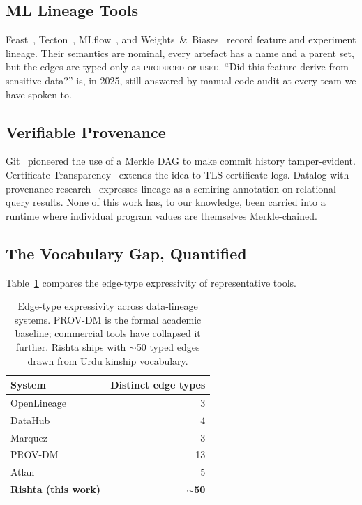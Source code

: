 \documentclass[10pt,twocolumn]{article}
\begin{document}
\subsection{ML Lineage Tools}

Feast~\cite{feast}, Tecton~\cite{tecton}, MLflow~\cite{mlflow}, and Weights~\&~Biases~\cite{wandb} record feature and experiment lineage. Their semantics are nominal, every artefact has a name and a parent set, but the edges are typed only as \textsc{produced} or \textsc{used}. ``Did this feature derive from sensitive data?'' is, in 2025, still answered by manual code audit at every team we have spoken to.

\subsection{Verifiable Provenance}

Git~\cite{git} pioneered the use of a Merkle DAG to make commit history tamper-evident. Certificate Transparency~\cite{ct-rfc} extends the idea to TLS certificate logs. Datalog-with-provenance research~\cite{provenance-semirings} expresses lineage as a semiring annotation on relational query results. None of this work has, to our knowledge, been carried into a runtime where individual program values are themselves Merkle-chained.

\subsection{The Vocabulary Gap, Quantified}

Table~\ref{tab:vocab-gap} compares the edge-type expressivity of representative tools.

\begin{table}[h]
\centering
\small
\begin{tabular}{lr}
\hline
System & Distinct edge types \\
\hline
OpenLineage~\cite{openlineage} & 3 \\
DataHub~\cite{datahub} & 4 \\
Marquez~\cite{marquez} & 3 \\
PROV-DM~\cite{prov-dm} & 13 \\
Atlan~\cite{atlan} & 5 \\
\textbf{Rishta (this work)} & \textbf{$\sim$50} \\
\hline
\end{tabular}
\caption{Edge-type expressivity across data-lineage systems. PROV-DM is the formal academic baseline; commercial tools have collapsed it further. Rishta ships with $\sim$50 typed edges drawn from Urdu kinship vocabulary.}
\label{tab:vocab-gap}
\end{table}
\end{document}
